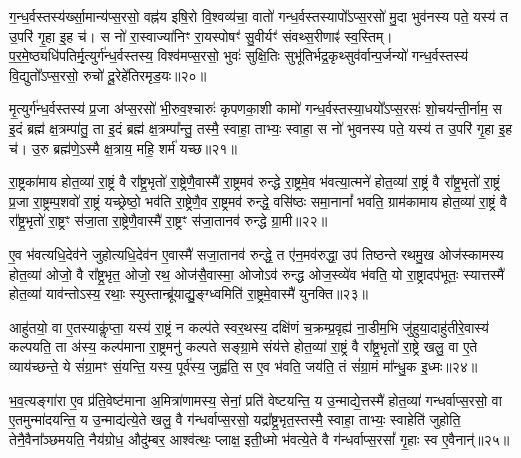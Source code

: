 ग॒न्ध॒र्वस्तस्य॑र्ख्सा॒मान्य॑प्स॒रसो॒ वह्न॑य इषि॒रो वि॒श्वव्य॑चा॒ वातो॑ गन्ध॒र्वस्तस्यापो᳚\-ऽप्स॒रसो॑ मु॒दा भुव॑नस्य पते॒ यस्य॑ त उ॒परि॑ गृ॒हा इ॒ह च॑। स नो॑ रा॒स्वाज्या॑निꣳ रा॒यस्पोषꣳ॑ सु॒वीर्यꣳ॑ संवथ्स॒रीणाꣴ॑ स्व॒स्तिम्। प॒र॒मे॒ष्ठ्यधि॑पति\-र्मृ॒त्युर्ग॑न्ध॒र्वस्तस्य॒ विश्व॑मप्स॒रसो॒ भुवः॑ सुक्षि॒तिः सुभू॑तिर्भद्र॒कृथ्सुव॑र्वान्प॒र्जन्यो॑ गन्ध॒र्वस्तस्य॑ वि॒द्युतो᳚\-ऽप्स॒रसो॒ रुचो॑ दू॒रेहे॑तिरमृड॒यः॥२०॥

मृ॒त्युर्ग॑न्ध॒र्वस्तस्य॑ प्र॒जा अ॑प्स॒रसो॑ भी॒रुव॒श्चारुः॑ कृपणका॒शी कामो॑ गन्ध॒र्वस्तस्या॒धयो᳚\-ऽप्स॒रसः॑ शो॒चय॑न्ती॒र्नाम॒ स इ॒दं ब्रह्म॑ क्ष॒त्रम्पा॑तु॒ ता इ॒दं ब्रह्म॑ क्ष॒त्रम्पा᳚न्तु॒ तस्मै॒ स्वाहा॒ ताभ्यः॒ स्वाहा॒ स नो॑ भुवनस्य पते॒ यस्य॑ त उ॒परि॑ गृ॒हा इ॒ह च॑। उ॒रु ब्रह्म॑णे॒\-ऽस्मै क्ष॒त्राय॒ महि॒ शर्म॑ यच्छ॥२१॥

{\anuvakamend[{मनो॑\-ऽमृड॒यष्षट्च॑त्वारिꣳशच्च॥७॥}]}

रा॒ष्ट्रका॑माय होत॒व्या॑ रा॒ष्ट्रं वै रा᳚ष्ट्र॒भृतो॑ रा॒ष्ट्रेणै॒वास्मै॑ रा॒ष्ट्रमव॑ रुन्द्धे रा॒ष्ट्रमे॒व भ॑वत्या॒त्मने॑ होत॒व्या॑ रा॒ष्ट्रं वै रा᳚ष्ट्र॒भृतो॑ रा॒ष्ट्रं प्र॒जा रा॒ष्ट्रम्प॒शवो॑ रा॒ष्ट्रं यच्छ्रेष्ठो॒ भव॑ति रा॒ष्ट्रेणै॒व रा॒ष्ट्रमव॑ रुन्द्धे॒ वसि॑ष्ठः समा॒नानां᳚ भवति॒ ग्राम॑कामाय होत॒व्या॑ रा॒ष्ट्रं वै रा᳚ष्ट्र॒भृतो॑ रा॒ष्ट्रꣳ स॑जा॒ता रा॒ष्ट्रेणै॒वास्मै॑ रा॒ष्ट्रꣳ स॑जा॒तानव॑ रुन्द्धे ग्रा॒मी॥२२॥

ए॒व भ॑वत्यधि॒देव॑ने जुहोत्यधि॒देव॑न ए॒वास्मै॑ सजा॒तानव॑ रुन्द्धे॒ त ए॑न॒मव॑रुद्धा॒ उप॑ तिष्ठन्ते रथमु॒ख ओज॑स्कामस्य होत॒व्या॑ ओजो॒ वै रा᳚ष्ट्र॒भृत॒ ओजो॒ रथ॒ ओज॑सै॒वास्मा॒ ओजो\-ऽव॑ रुन्द्ध ओज॒स्व्ये॑व भ॑वति॒ यो रा॒ष्ट्रादप॑भूतः॒ स्यात्तस्मै॑ होत॒व्या॑ याव॑न्तो\-ऽस्य॒ रथाः॒ स्युस्तान्ब्रू॑याद्यु॒ङ्ग्ध्वमिति॑ रा॒ष्ट्रमे॒वास्मै॑ युनक्ति॥२३॥

आहु॑तयो॒ वा ए॒तस्याकॢ॑प्ता॒ यस्य॑ रा॒ष्ट्रं न कल्प॑ते स्वर॒थस्य॒ दक्षि॑णं च॒क्रम्प्र॒वृह्य॑ ना॒डीम॒भि जु॑हुया॒दाहु॑तीरे॒वास्य॑ कल्पयति॒ ता अ॑स्य॒ कल्प॑माना रा॒ष्ट्रमनु॑ कल्पते सङ्ग्रा॒मे संय॑त्ते होत॒व्या॑ रा॒ष्ट्रं वै रा᳚ष्ट्र॒भृतो॑ रा॒ष्ट्रे खलु॒ वा ए॒ते व्याय॑च्छन्ते॒ ये सं॑ग्रा॒मꣳ सं॒यन्ति॒ यस्य॒ पूर्व॑स्य॒ जुह्व॑ति॒ स ए॒व भ॑वति॒ जय॑ति॒ तं सं॑ग्रा॒मं मा᳚न्धु॒क इ॒ध्मः॥२४॥

भ॒व॒त्यङ्गा॑रा ए॒व प्र॑ति॒वेष्ट॑माना अ॒मित्रा॑णामस्य॒ सेनां॒ प्रति॑ वेष्टयन्ति॒ य उ॒न्माद्ये॒त्तस्मै॑ होत॒व्या॑ गन्धर्वाप्स॒रसो॒ वा ए॒तमुन्मा॑दयन्ति॒ य उ॒न्माद्य॑त्ये॒ते खलु॒ वै ग॑न्धर्वाप्स॒रसो॒ यद्रा᳚ष्ट्र॒भृत॒स्तस्मै॒ स्वाहा॒ ताभ्यः॒ स्वाहेति॑ जुहोति॒ तेनै॒वैना᳚ञ्छमयति॒ नैय॑ग्रोध॒ औदु॑म्बर॒ आश्व॑त्थः॒ प्लाक्ष॒ इती॒ध्मो भ॑वत्ये॒ते वै ग॑न्धर्वाप्स॒रसां᳚ गृ॒हाः स्व ए॒वैनान्॑॥२५॥

